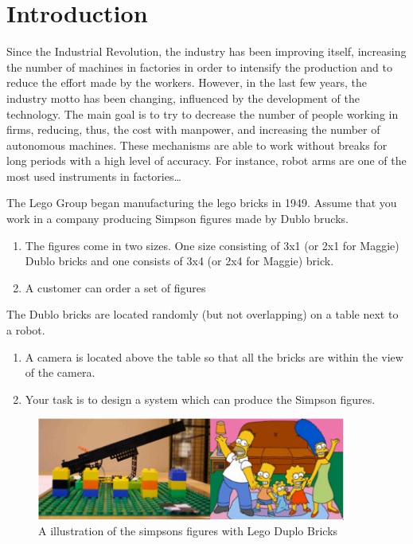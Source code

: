 \chapter{Introduction}\label{ch:introduction}

Since the Industrial Revolution, the industry has been improving itself, increasing the number of machines in factories in order to intensify the production and to reduce the effort made by the workers. However, in the last few years, the industry motto has been changing, influenced by the development of the technology. The main goal is to try to decrease the number of people working in firms, reducing, thus, the cost with manpower, and increasing the number of autonomous machines. These mechanisms are able to work without breaks for long periods with a high level of accuracy. For instance, robot arms are one of the most used instruments in factories…


The Lego Group began manufacturing the lego bricks in 1949. 
Assume that you work in a company producing Simpson figures made by Dublo brucks.

\begin{enumerate}
	\item The figures come in two sizes. One size consisting of 3x1 (or 2x1 for Maggie) Dublo bricks and one consists of 3x4 (or 2x4 for Maggie) brick.
	\item A customer can order a set of figures
\end{enumerate}

The Dublo bricks are located randomly (but not
overlapping) on a table next to a robot.

\begin{enumerate}
	\item A camera is located above the table so that all the
	bricks are within the view of the camera.
	\item Your task is to design a system which can produce
	the Simpson figures. 
\end{enumerate}

\begin{figure}[hb]
  \centering
  \includegraphics[width=4in]{figures/simpsonLegoBricks.png}
  \caption[Simpsons figures Lego Bricks] {A illustration of the simpsons figures with Lego Duplo Bricks}
\end{figure}

